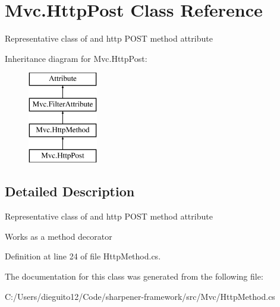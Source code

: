 \hypertarget{class_mvc_1_1_http_post}{}\section{Mvc.\+Http\+Post Class Reference}
\label{class_mvc_1_1_http_post}


Representative class of and http P\+O\+ST method attribute  


Inheritance diagram for Mvc.\+Http\+Post\+:\begin{figure}[H]
\begin{center}
\leavevmode
\includegraphics[height=4.000000cm]{class_mvc_1_1_http_post}
\end{center}
\end{figure}


\subsection{Detailed Description}
Representative class of and http P\+O\+ST method attribute 

Works as a method decorator

Definition at line 24 of file Http\+Method.\+cs.



The documentation for this class was generated from the following file\+:\begin{DoxyCompactItemize}
\item 
C\+:/\+Users/dieguito12/\+Code/sharpener-\/framework/src/\+Mvc/Http\+Method.\+cs\end{DoxyCompactItemize}
